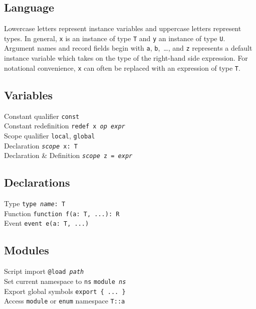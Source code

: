 \documentclass[10pt,landscape]{article}
\begin{document}
\begin{multicols*}{3}
\section*{Language}

Lowercase letters represent instance variables and uppercase letters represent
types. In general, \texttt{x} is an instance of type \texttt{T} and \texttt{y}
an instance of type \texttt{U}. Argument names and record fields begin
with \texttt{a}, \texttt{b},~\ldots, and \texttt{z} represents a default
instance variable which takes on the type of the right-hand side expression.
For notational convenience, \texttt{x} can often be replaced with an expression
of type \texttt{T}.

\subsection*{Variables}

Constant qualifier \dotfill \texttt{const}\\
Constant redefinition \dotfill \texttt{redef x \textit{op} \textit{expr}}\\
Scope qualifier \dotfill \texttt{local}, \texttt{global}\\
Declaration \dotfill \texttt{\textit{scope} x:~T}\\
Declaration \& Definition \dotfill \texttt{\textit{scope} z = \textit{expr}}

\subsection*{Declarations}

Type \dotfill \texttt{type~\textit{name}:~T}\\
Function \dotfill \verb|function f(a: T, ...): R|\\
Event \dotfill \verb|event e(a: T, ...)|

\subsection*{Modules}

Script import \dotfill \texttt{@load \textit{path}}\\
Set current namespace to \texttt{ns} \dotfill \texttt{module \textit{ns}}\\
Export global symbols \dotfill \verb|export { ... }|\\
Access \texttt{module} or \texttt{enum} namespace \dotfill \verb|T::a|


\end{multicols*}
\end{document}
